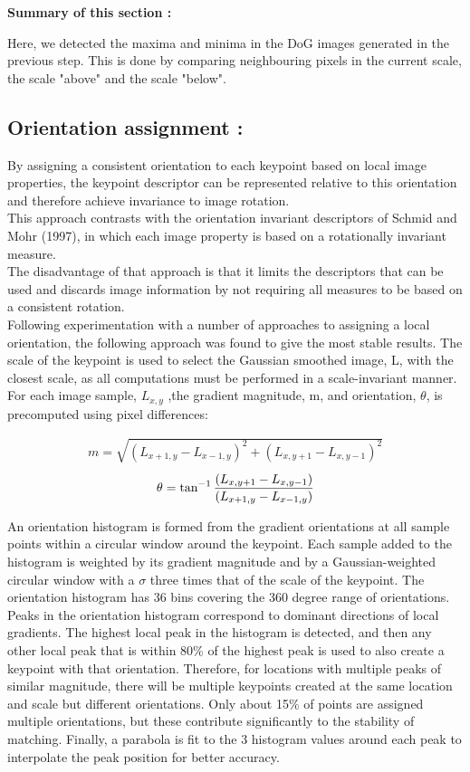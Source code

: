 \textbf{Summary of this section :}

Here, we detected the maxima and minima in the DoG images generated in the previous step. This is done by comparing neighbouring pixels in the current scale, the scale "above" and the scale "below".


\subsection{Orientation assignment :}
By assigning a consistent orientation to each keypoint based on local image properties,
the keypoint descriptor can be represented relative to this orientation and therefore achieve
invariance to image rotation.\\ This approach contrasts with the orientation invariant descriptors
of Schmid and Mohr (1997), in which each image property is based on a rotationally
invariant measure.\\ The disadvantage of that approach is that it limits the descriptors that
can be used and discards image information by not requiring all measures to be based on a
consistent rotation.\\

Following experimentation with a number of approaches to assigning a local orientation,
the following approach was found to give the most stable results. The scale of the
keypoint is used to select the Gaussian smoothed image, L, with the closest scale, as all
computations must be performed in a scale-invariant manner. For each image sample, $L_{x,y}$ ,the gradient magnitude, m, and orientation, $\theta$, is precomputed using pixel differences:

\begin{align}
 m  =\sqrt{(L_{x+1,y} - L_{x-1,y})^2 + (L_{x,y+1} - L_{x,y-1})^2}
\end{align}
\begin{align}
  \theta = \tan^{\small{-1}}\frac{(L_{x,y+1} - L_{x,y-1})}{(L_{x+1,y} - L_{x-1,y})}
\end{align}

An orientation histogram is formed from the gradient orientations at all sample points
within a circular window around the keypoint. Each sample added to the histogram is
weighted by its gradient magnitude and by a Gaussian-weighted circular window with a $\sigma$
three times that of the scale of the keypoint. The orientation histogram has 36 bins covering
the 360 degree range of orientations.
Peaks in the orientation histogram correspond to dominant directions of local gradients.
The highest local peak in the histogram is detected, and then any other local peak that is
within 80\% of the highest peak is used to also create a keypoint with that orientation.
Therefore, for locations with multiple peaks of similar magnitude, there will be multiple
keypoints created at the same location and scale but different orientations. Only about
15\% of points are assigned multiple orientations, but these contribute signiﬁcantly to the
stability of matching. Finally, a parabola is ﬁt to the 3 histogram values around each peak
to interpolate the peak position for better accuracy.



